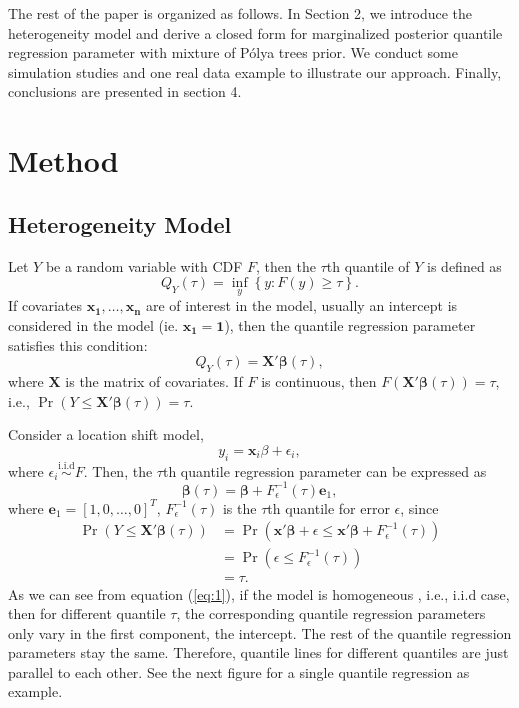 \documentclass[12pt]{article}
\newcommand{\polya}{P\'{o}lya}
\DeclareMathOperator{\pr}{Pr}
\begin{document}
The rest of the paper is organized as follows. In Section 2, we
introduce the heterogeneity model and derive a closed form for
marginalized posterior quantile regression parameter with mixture of
\polya{} trees prior. We conduct some simulation studies and one real
data example to illustrate our approach. Finally, conclusions are
presented in section 4. 

\section{Method}
\subsection{Heterogeneity Model}
Let $Y$ be a random variable with CDF $F$, then the $\tau$th quantile
of $Y$ is defined as 
\begin{displaymath}
  Q_Y(\tau) = \underset{y}{\inf} \left\{ y: F(y) \ge \tau \right\}.
\end{displaymath}
If covariates $\bm{x_1, \ldots, x_n}$ are of interest in the model,
usually an intercept is considered in the model (ie. $\bm{x_1}=
\bm{1}$), then the quantile regression parameter satisfies this
condition: 
\begin{displaymath}
  Q_Y(\tau) = \bm{X'\beta}(\tau),
\end{displaymath}
where $\bm{X}$ is the matrix of covariates. If $F$ is continuous, then
$F(\bm{X'\beta}(\tau)) = \tau$, i.e., $\pr(Y \le \bm{X'\beta}(\tau)) =
\tau$. 

Consider a location shift model, 
\begin{displaymath}
  y_i = \bm{x}_i\beta + \epsilon_i, 
\end{displaymath}
where $\epsilon_i \stackrel{\text{i.i.d}}{\sim} F$. Then, the $\tau$th
quantile regression parameter can be expressed as 
\begin{equation}
\label{eq:1}
  \bm{\beta}(\tau) = \bm{\beta} + F^{-1}_{\epsilon}(\tau) \bm{e}_1,
\end{equation}
where $\bm{e}_1 = [1, 0, \ldots, 0]^T$, $F^{-1}_{\epsilon}(\tau)$ is
the $\tau$th quantile for error $\epsilon$, since 
\begin{align*}
\pr (Y \le \bm{X'\beta}(\tau)) & = \pr \left( \bm{x'\beta} + \epsilon
  \le \bm{x'\beta} + F^{-1}_{\epsilon}(\tau) \right) \\
& = \pr (\epsilon \le F^{-1}_{\epsilon}(\tau)) \\
& = \tau. 
\end{align*}
As we can see from equation (\ref{eq:1}), if the model is homogeneous
, i.e., i.i.d case, then for different quantile $\tau$, the
corresponding quantile regression parameters only vary in the
first component, the intercept. The rest of the quantile regression
parameters stay the same. Therefore, quantile lines for different quantiles are
just parallel to each other. See the next figure for a single quantile
regression as example. 
\end{document}
